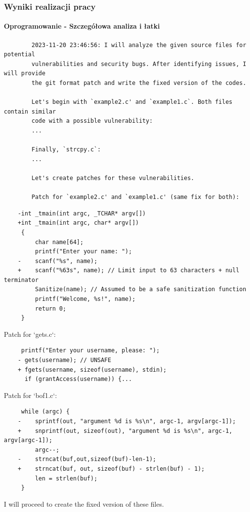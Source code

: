 \documentclass[lualatex,aspectratio=54,12pt,]{beamer}
\begin{document}
    \begin{frame}[fragile]
      \frametitle{Wyniki realizacji pracy}
      \framesubtitle{Oprogramowanie - Szczegółowa analiza i łatki}
      \tiny
      \begin{verbatim}
        2023-11-20 23:46:56: I will analyze the given source files for potential 
        vulnerabilities and security bugs. After identifying issues, I will provide 
        the git format patch and write the fixed version of the codes.
    
        Let's begin with `example2.c' and `example1.c`. Both files contain similar 
        code with a possible vulnerability:
        ...
    
        Finally, `strcpy.c`:
        ...
    
        Let's create patches for these vulnerabilities.
    
        Patch for `example2.c' and `example1.c' (same fix for both):
      \end{verbatim}
    \begin{verbatim}
    -int _tmain(int argc, _TCHAR* argv[])
    +int _tmain(int argc, char* argv[])
     {
         char name[64];
         printf("Enter your name: ");
    -    scanf("%s", name);
    +    scanf("%63s", name); // Limit input to 63 characters + null terminator
         Sanitize(name); // Assumed to be a safe sanitization function
         printf("Welcome, %s!", name);
         return 0;
     }
    \end{verbatim}

    Patch for `gets.c`:

    \begin{verbatim}
     printf("Enter your username, please: ");
    - gets(username); // UNSAFE
    + fgets(username, sizeof(username), stdin);
      if (grantAccess(username)) {...
    \end{verbatim}

    Patch for `bof1.c`:

    \begin{verbatim}
     while (argc) {
    -    sprintf(out, "argument %d is %s\n", argc-1, argv[argc-1]);
    +    snprintf(out, sizeof(out), "argument %d is %s\n", argc-1, argv[argc-1]);
         argc--;
    -    strncat(buf,out,sizeof(buf)-len-1);
    +    strncat(buf, out, sizeof(buf) - strlen(buf) - 1);
         len = strlen(buf);
     }
    \end{verbatim}
    
        I will proceed to create the fixed version of these files.

\end{frame}
    
\end{document}

